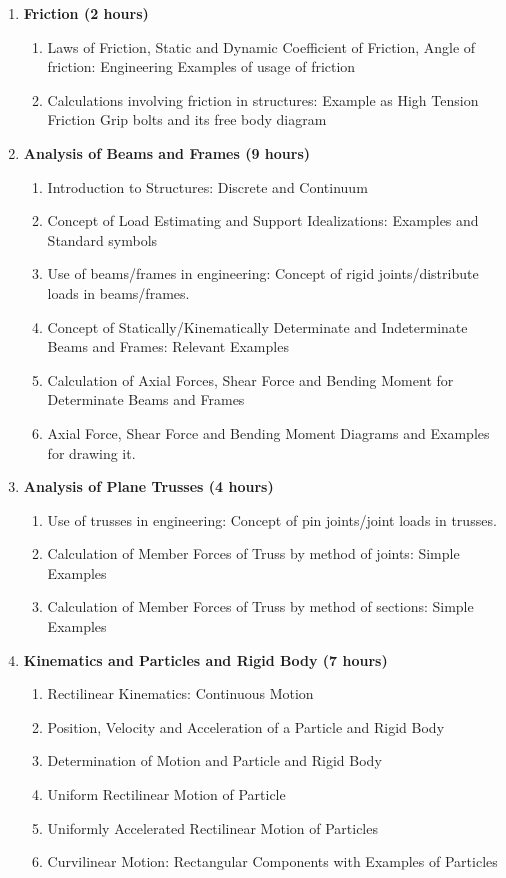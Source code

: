 \begin{enumerate}
    \item \textbf{Friction \hfill (2 hours)}
    \begin{enumerate}
        \item Laws of Friction, Static and Dynamic Coefficient of Friction, Angle of friction: Engineering Examples of usage of friction
        \item Calculations involving friction in structures: Example as High Tension Friction Grip bolts and its free body diagram
    \end{enumerate}
    
    \item \textbf{Analysis of Beams and Frames \hfill (9 hours)}
    \begin{enumerate}
        \item Introduction to Structures: Discrete and Continuum
        \item Concept of Load Estimating and Support Idealizations: Examples and Standard symbols
        \item Use of beams/frames in engineering: Concept of rigid joints/distribute loads in beams/frames.
        \item Concept of Statically/Kinematically Determinate and Indeterminate Beams and Frames: Relevant Examples
        \item Calculation of Axial Forces, Shear Force and Bending Moment for Determinate Beams and Frames
        \item Axial Force, Shear Force and Bending Moment Diagrams and Examples for drawing it.
    \end{enumerate}
    
    \item \textbf{Analysis of Plane Trusses \hfill (4 hours)}
    \begin{enumerate}
        \item Use of trusses in engineering: Concept of pin joints/joint loads in trusses.
        \item Calculation of Member Forces of Truss by method of joints: Simple Examples
        \item Calculation of Member Forces of Truss by method of sections: Simple Examples
    \end{enumerate}
    
    \item \textbf{Kinematics and Particles and Rigid Body \hfill (7 hours)}
    \begin{enumerate}
        \item Rectilinear Kinematics: Continuous Motion
        \item Position, Velocity and Acceleration of a Particle and Rigid Body
        \item Determination of Motion and Particle and Rigid Body
        \item Uniform Rectilinear Motion of Particle
        \item Uniformly Accelerated Rectilinear Motion of Particles
        \item Curvilinear Motion: Rectangular Components with Examples of Particles
    \end{enumerate}
    

\end{enumerate}
